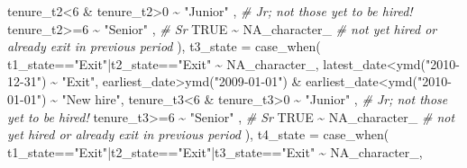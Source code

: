 \documentclass[
]{article}
\newenvironment{Shaded}{\begin{snugshade}}{\end{snugshade}}
\newcommand{\AttributeTok}[1]{\textcolor[rgb]{0.77,0.63,0.00}{#1}}
\newcommand{\CommentTok}[1]{\textcolor[rgb]{0.56,0.35,0.01}{\textit{#1}}}
\newcommand{\ConstantTok}[1]{\textcolor[rgb]{0.00,0.00,0.00}{#1}}
\newcommand{\DecValTok}[1]{\textcolor[rgb]{0.00,0.00,0.81}{#1}}
\newcommand{\FunctionTok}[1]{\textcolor[rgb]{0.00,0.00,0.00}{#1}}
\newcommand{\NormalTok}[1]{#1}
\newcommand{\SpecialCharTok}[1]{\textcolor[rgb]{0.00,0.00,0.00}{#1}}
\newcommand{\StringTok}[1]{\textcolor[rgb]{0.31,0.60,0.02}{#1}}
\begin{document}
\begin{Shaded}
\begin{Highlighting}[]
\NormalTok{      tenure\_t2}\SpecialCharTok{\textless{}}\DecValTok{6} \SpecialCharTok{\&}\NormalTok{ tenure\_t2}\SpecialCharTok{\textgreater{}}\DecValTok{0}          \SpecialCharTok{\textasciitilde{}} \StringTok{"Junior"}\NormalTok{  , }\CommentTok{\# Jr; not those yet to be hired!}
\NormalTok{      tenure\_t2}\SpecialCharTok{\textgreater{}=}\DecValTok{6}                       \SpecialCharTok{\textasciitilde{}} \StringTok{"Senior"}\NormalTok{  , }\CommentTok{\# Sr}
      \ConstantTok{TRUE}                               \SpecialCharTok{\textasciitilde{}} \ConstantTok{NA\_character\_} \CommentTok{\# not yet hired or already exit in previous period}
\NormalTok{      ),}
    \AttributeTok{t3\_state =} \FunctionTok{case\_when}\NormalTok{(}
\NormalTok{      t1\_state}\SpecialCharTok{==}\StringTok{"Exit"}\SpecialCharTok{|}\NormalTok{t2\_state}\SpecialCharTok{==}\StringTok{"Exit"}                   \SpecialCharTok{\textasciitilde{}} \ConstantTok{NA\_character\_}\NormalTok{,}
\NormalTok{      latest\_date}\SpecialCharTok{\textless{}}\FunctionTok{ymd}\NormalTok{(}\StringTok{"2010{-}12{-}31"}\NormalTok{)        }\SpecialCharTok{\textasciitilde{}} \StringTok{"Exit"}\NormalTok{,}
\NormalTok{      earliest\_date}\SpecialCharTok{\textgreater{}}\FunctionTok{ymd}\NormalTok{(}\StringTok{"2009{-}01{-}01"}\NormalTok{) }
        \SpecialCharTok{\&}\NormalTok{ earliest\_date}\SpecialCharTok{\textless{}}\FunctionTok{ymd}\NormalTok{(}\StringTok{"2010{-}01{-}01"}\NormalTok{) }\SpecialCharTok{\textasciitilde{}} \StringTok{"New hire"}\NormalTok{,}
\NormalTok{      tenure\_t3}\SpecialCharTok{\textless{}}\DecValTok{6} \SpecialCharTok{\&}\NormalTok{ tenure\_t3}\SpecialCharTok{\textgreater{}}\DecValTok{0}          \SpecialCharTok{\textasciitilde{}} \StringTok{"Junior"}\NormalTok{  , }\CommentTok{\# Jr; not those yet to be hired!}
\NormalTok{      tenure\_t3}\SpecialCharTok{\textgreater{}=}\DecValTok{6}                       \SpecialCharTok{\textasciitilde{}} \StringTok{"Senior"}\NormalTok{  , }\CommentTok{\# Sr}
      \ConstantTok{TRUE}                               \SpecialCharTok{\textasciitilde{}} \ConstantTok{NA\_character\_} \CommentTok{\# not yet hired or already exit in previous period}
\NormalTok{      ),}
    \AttributeTok{t4\_state =} \FunctionTok{case\_when}\NormalTok{(}
\NormalTok{      t1\_state}\SpecialCharTok{==}\StringTok{"Exit"}\SpecialCharTok{|}\NormalTok{t2\_state}\SpecialCharTok{==}\StringTok{"Exit"}\SpecialCharTok{|}\NormalTok{t3\_state}\SpecialCharTok{==}\StringTok{"Exit"}                   \SpecialCharTok{\textasciitilde{}} \ConstantTok{NA\_character\_}\NormalTok{,}

\end{Highlighting}
\end{Shaded}
\end{document}
